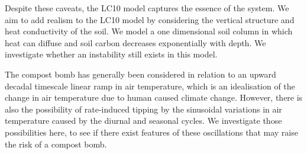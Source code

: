 Despite these caveats, the LC10 model captures the essence of the system. We aim to add realism to the LC10 model by considering the vertical structure and heat conductivity of the soil.
We model a one dimensional soil column in which heat can diffuse and soil carbon decreases exponentially with depth. We investigate whether an instability still exists in this model.

The compost bomb has generally been considered in relation to an upward decadal timescale linear ramp in air temperature, which is an idealisation of the change in air temperature due to
human caused climate change. However, there is also the possibility of
rate-induced tipping by the sinusoidal variations in air temperature caused by the diurnal and seasonal cycles. We investigate those possibilities here, to see if there exist
features of these oscillations that may raise the risk of a compost bomb.






